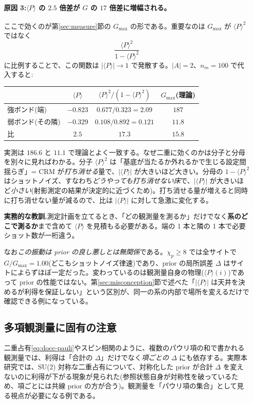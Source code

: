 \documentclass[11pt,a4paper]{ltjsarticle}
\newcommand{\ev}[1]{\langle #1\rangle}
\begin{document}
\paragraph{原因 3:$\ev{P}$ の $2.5$ 倍差が $G$ の $17$ 倍差に増幅される。}
ここで効くのが第\ref{sec:measure}節の $G_{\max}$ の形である。重要なのは $G_{\max}$ が $\ev{P}^2$ ではなく
\begin{equation}
  \frac{\ev{P}^2}{1-\ev{P}^2}
\end{equation}
に比例することで、この関数は $|\ev{P}|\to1$ で発散する。$|A|=2$、$n_m=100$ で代入すると:
\begin{center}\small
\begin{tabular}{lccc}
\toprule
 & $\ev{P}$ & $\ev{P}^2/(1-\ev{P}^2)$ & $G_{\max}$(理論) \\
\midrule
強ボンド(端)      & $-0.823$ & $0.677/0.323=2.09$  & $187$ \\
弱ボンド(その隣)  & $-0.329$ & $0.108/0.892=0.121$ & $11.8$ \\
\midrule
比                 & $2.5$    & $\mathbf{17.3}$     & $\mathbf{15.8}$ \\
\bottomrule
\end{tabular}
\end{center}
実測は $186.6$ と $11.1$ で理論とよく一致する。なぜ二重に効くのかは分子と分母を別々に見ればわかる。分子 $\ev{P}^2$ は「基底が当たるか外れるかで生じる設定間揺らぎ」= CRM が\emph{打ち消せる}量で、$|\ev{P}|$ が大きいほど大きい。分母の $1-\ev{P}^2$ はショットノイズ、すなわち\emph{どうやっても打ち消せない床}で、$|\ev{P}|$ が大きいほど\emph{小さい}(射影測定の結果が決定的に近づくため)。打ち消せる量が増えると同時に打ち消せない量が減るので、比は $|\ev{P}|$ に対して急激に変化する。

\begin{keybox}
\textbf{実務的な教訓.}測定計画を立てるとき、「どの観測量を測るか」だけでなく\textbf{系のどこで測るか}まで含めて $\ev{P}$ を見積もる必要がある。端の 1 本と隣の 1 本で必要ショット数が一桁違う。

なお\emph{この振動は prior の良し悪しとは無関係}である。$\chi_p\ge8$ では全サイトで $G/G_{\max}=1.00$(どこもショットノイズ律速)であり、prior の局所誤差 $\Delta$ はサイトによらずほぼ一定だった。変わっているのは観測量自身の物理($\ev{P}(i)$)であって prior の性能ではない。第\ref{sec:misconception}節で述べた「$|\ev{P}|$ は天井を決めるが利得を保証しない」という区別が、同一の系の内部で場所を変えるだけで確認できる例になっている。
\end{keybox}

\subsection{多項観測量に固有の注意}
\label{sec:multi}
二重占有\eqref{eq:docc-pauli}やスピン相関のように、複数のパウリ項の和で書かれる観測量では、利得は「合計の $\Delta$」だけでなく\emph{項ごとの $\Delta$} にも依存する。実際本研究では、SU(2) 対称な二重占有について、対称化した prior が合計 $\Delta$ を変えないのに利得が下がる現象が見られた(参照状態自身が対称性を破っているため、項ごとには共線 prior の方が合う)。観測量を「パウリ項の集合」として見る視点が必要になる例である。
\end{document}
